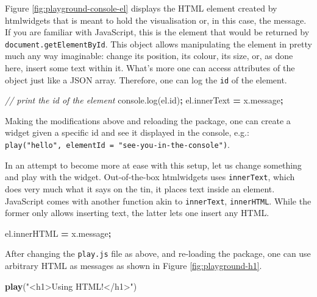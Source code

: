 \documentclass[10pt,]{krantz}
\makeatletter
\newenvironment{Shaded}{\begin{snugshade}}{\end{snugshade}}
\newcommand{\AttributeTok}[1]{\textcolor[rgb]{0.61,0.61,0.61}{#1}}
\newcommand{\CommentTok}[1]{\textcolor[rgb]{0.37,0.37,0.37}{\textit{#1}}}
\newcommand{\KeywordTok}[1]{\textcolor[rgb]{0.27,0.27,0.27}{\textbf{#1}}}
\newcommand{\NormalTok}[1]{#1}
\newcommand{\OperatorTok}[1]{\textcolor[rgb]{0.43,0.43,0.43}{\textbf{#1}}}
\newcommand{\StringTok}[1]{\textcolor[rgb]{0.5,0.5,0.5}{#1}}
\newcommand{\VariableTok}[1]{\textcolor[rgb]{0,0,0}{#1}}
\newenvironment{kframe}{%
\medskip{}
\setlength{\fboxsep}{.8em}
 \def\at@end@of@kframe{}%
 \ifinner\ifhmode%
  \def\at@end@of@kframe{\end{minipage}}%
  \begin{minipage}{\columnwidth}%
 \fi\fi%
 \def\FrameCommand##1{\hskip\@totalleftmargin \hskip-\fboxsep
 \colorbox{shadecolor}{##1}\hskip-\fboxsep
     \hskip-\linewidth \hskip-\@totalleftmargin \hskip\columnwidth}%
 \MakeFramed {\advance\hsize-\width
   \@totalleftmargin\z@ \linewidth\hsize
   \@setminipage}}%
 {\par\unskip\endMakeFramed%
 \at@end@of@kframe}
\renewenvironment{Shaded}{\begin{kframe}}{\end{kframe}}
\makeatother
\begin{document}
Figure \ref{fig:playground-console-el} displays the HTML element created by htmlwidgets that is meant to hold the visualisation or, in this case, the message. If you are familiar with JavaScript, this is the element that would be returned by \texttt{document.getElementById}. This object allows manipulating the element in pretty much any way imaginable: change its position, its colour, its size, or, as done here, insert some text within it. What's more one can access attributes of the object just like a JSON array. Therefore, one can log the \texttt{id} of the element.

\begin{Shaded}
\begin{Highlighting}[]
\CommentTok{// print the id of the element}
\VariableTok{console}\NormalTok{.}\AttributeTok{log}\NormalTok{(}\VariableTok{el}\NormalTok{.}\AttributeTok{id}\NormalTok{)}\OperatorTok{;}
\VariableTok{el}\NormalTok{.}\AttributeTok{innerText} \OperatorTok{=} \VariableTok{x}\NormalTok{.}\AttributeTok{message}\OperatorTok{;}
\end{Highlighting}
\end{Shaded}

Making the modifications above and reloading the package, one can create a widget given a specific id and see it displayed in the console, e.g.: \texttt{play("hello",\ elementId\ =\ "see-you-in-the-console")}.

In an attempt to become more at ease with this setup, let us change something and play with the widget. Out-of-the-box htmlwidgets uses \texttt{innerText}, which does very much what it says on the tin, it places text inside an element. JavaScript comes with another function akin to \texttt{innerText}, \texttt{innerHTML}. While the former only allows inserting text, the latter lets one insert any HTML.

\begin{Shaded}
\begin{Highlighting}[]
\VariableTok{el}\NormalTok{.}\AttributeTok{innerHTML} \OperatorTok{=} \VariableTok{x}\NormalTok{.}\AttributeTok{message}\OperatorTok{;}
\end{Highlighting}
\end{Shaded}

After changing the \texttt{play.js} file as above, and re-loading the package, one can use arbitrary HTML as messages as shown in Figure \ref{fig:playground-h1}.

\begin{Shaded}
\begin{Highlighting}[]
\KeywordTok{play}\NormalTok{(}\StringTok{"<h1>Using HTML!</h1>"}\NormalTok{)}
\end{Highlighting}
\end{Shaded}
\end{document}
